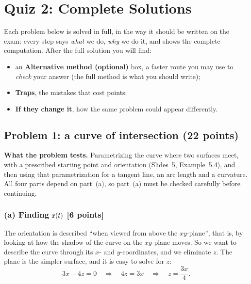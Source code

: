 \section{Quiz 2: Complete Solutions}\label{ch:quizsol}

Each problem below is solved in full, in the way it should be written on the
exam: every step says \emph{what} we do, \emph{why} we do it, and shows the
complete computation. After the full solution you will find:
\begin{itemize}
\item an \textbf{Alternative method (optional)} box, a faster route you may use
      to \emph{check} your answer (the full method is what you should write);
\item \textbf{Traps}, the mistakes that cost points;
\item \textbf{If they change it}, how the same problem could appear differently.
\end{itemize}

\subsection{Problem 1: a curve of intersection (22 points)}

\textbf{What the problem tests.} Parametrizing the curve where two surfaces meet,
with a prescribed starting point and orientation (Slides~5, Example~5.4), and
then using that parametrization for a tangent line, an arc length and a
curvature. All four parts depend on part~(a), so part~(a) must be checked
carefully before continuing.

\subsubsection*{(a) Finding $\mathbf{r}(t)$ [6 points]}

The orientation is described ``when viewed from above the $xy$-plane'', that is,
by looking at how the shadow of the curve on the $xy$-plane moves. So we want
to describe the curve through its $x$- and $y$-coordinates, and we eliminate
$z$. The plane is the simpler surface, and it is easy to solve for $z$:
\[
  3x-4z=0\quad\Longrightarrow\quad 4z=3x\quad\Longrightarrow\quad z=\frac{3x}{4}.
\]

